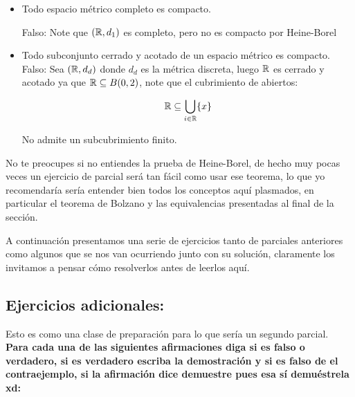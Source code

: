 \begin{itemize}[leftmargin=*]
    \item Todo espacio métrico completo es compacto.
    
    Falso: Note que $(\mathbb{R},d_1)$ es completo, pero no es compacto por Heine-Borel

    \item Todo subconjunto cerrado y acotado de un espacio métrico es compacto. \\ 
    
    Falso: Sea $(\mathbb{R},d_d)$ donde $d_d$ es la métrica discreta, luego $\mathbb{R}$ es cerrado y acotado ya que $\mathbb{R}\subseteq B(0,2)$, note que el cubrimiento de abiertos:

    $$\mathbb{R}\subseteq \bigcup_{i \in \mathbb{R}}\{x\}$$

        No admite un subcubrimiento finito.
\end{itemize}
 
\begin{note}
No te preocupes si no entiendes la prueba de Heine-Borel, de hecho muy pocas veces un ejercicio de parcial será tan fácil como usar ese teorema, lo que yo recomendaría sería entender bien todos los conceptos aquí plasmados, en particular el teorema de Bolzano y las equivalencias presentadas al final de la sección.
\end{note}

\begin{note}
A continuación presentamos una serie de ejercicios tanto de parciales anteriores como algunos que se nos van ocurriendo junto con su solución, claramente los invitamos a pensar cómo resolverlos antes de leerlos aquí.
\end{note}


\subsection{Ejercicios adicionales:}


Esto es como una clase de preparación para lo que sería un segundo parcial.\\

\textbf{Para cada una de las siguientes afirmaciones diga si es falso o verdadero, si es verdadero escriba la demostración y si es falso de el contraejemplo, si la afirmación dice demuestre pues esa sí demuéstrela xd:}

